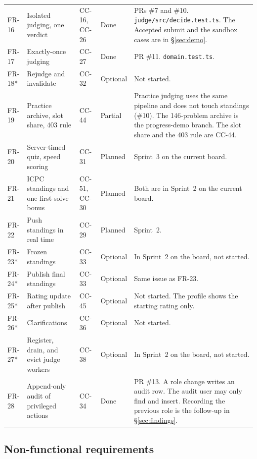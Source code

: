 \documentclass[11pt,a4paper]{article}
\begin{document}
{\begin{longtable}{@{}l p{} l l p{}@{}}
FR-16 & Isolated judging, one verdict & CC-16, CC-26 & Done &
PRs \#7 and \#10. \texttt{judge/src/decide.test.ts}. The Accepted submit and the sandbox cases are in \S\ref{sec:demo}. \\
FR-17 & Exactly-once judging & CC-27 & Done &
PR \#11. \texttt{domain.test.ts}. \\
FR-18* & Rejudge and invalidate & CC-32 & Optional & Not started. \\
FR-19 & Practice archive, slot share, 403 rule & CC-44 & Partial &
Practice judging uses the same pipeline and does not touch standings (\#10). The 146-problem archive is the progress-demo branch. The slot share and the 403 rule are CC-44. \\
FR-20 & Server-timed quiz, speed scoring & CC-31 & Planned & Sprint~3 on the current board. \\
FR-21 & ICPC standings and one first-solve bonus & CC-51, CC-30 & Planned & Both are in Sprint~2 on the current board. \\
FR-22 & Push standings in real time & CC-29 & Planned & Sprint~2. \\
FR-23* & Frozen standings & CC-33 & Optional & In Sprint~2 on the board, not started. \\
FR-24* & Publish final standings & CC-33 & Optional & Same issue as FR-23. \\
FR-25* & Rating update after publish & CC-45 & Optional & Not started. The profile shows the starting rating only. \\
FR-26* & Clarifications & CC-36 & Optional & Not started. \\
FR-27* & Register, drain, and evict judge workers & CC-38 & Optional & In Sprint~2 on the board, not started. \\
FR-28 & Append-only audit of privileged actions & CC-34 & Done &
PR \#13. A role change writes an audit row. The audit user may only find and insert. Recording the previous role is the follow-up in \S\ref{sec:findings}. \\
\bottomrule
\end{longtable}
}

\subsection{Non-functional requirements}
\end{document}
